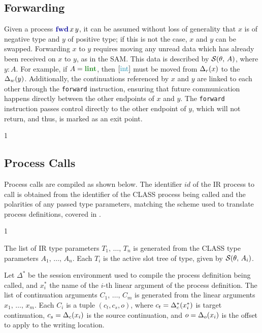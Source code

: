 \subsection{Forwarding}

Given a process $\fwdc{x}{y}$, it can be assumed without loss of generality that $x$ is of negative type and $y$ of positive type; if this is not the case, $x$ and $y$ can be swapped. Forwarding $x$ to $y$ requires moving any unread data which has already been received on $x$ to $y$, as in the \ac{SAM}. This data is described by $\mathcal{S}(\theta,\,A)$, where $y: A$. For example, if $A = \lintt$, then $\seqst{\ints}$ must be moved from $\Delta_r(x)$ to the $\Delta_w(y)$. Additionally, the continuations referenced by $x$ and $y$ are linked to each other through the \texttt{forward} instruction, ensuring that future communication happens directly between the other endpoints of $x$ and $y$. The \texttt{forward} instruction passes control directly to the other endpoint of $y$, which will not return, and thus, is marked as an exit point.
\begin{compilation}{\theta}{\Delta}{}
{1}
\end{compilation}

\subsection{Process Calls}

Process calls are compiled as shown below. The identifier $id$ of the \ac{IR} process to call is obtained from the identifier of the \ac{CLASS} process being called and the polarities of any passed type parameters, matching the scheme used to translate process definitions, covered in .
\begin{compilation}{\theta}{\Delta}{}{1}
\end{compilation}


The list of \ac{IR} type parameters $T_1,\,\dots,\,T_n$ is generated from the \ac{CLASS} type parameters $A_1,\,\dots,\,A_n$. Each $T_i$ is the active slot tree of type, given by $\mathcal{S}(\theta,\,A_i)$. 

Let $\Delta^*$ be the session environment used to compile the process definition being called, and $x^*_i$ the name of the $i$-th linear argument of the process definition. The list of continuation arguments $C_1,\,\dots,\,C_m$ is generated from the linear arguments $x_1,\,\dots,\,x_m$. Each $C_i$ is a tuple $(c_t, c_s, o)$, where $c_t = \Delta^*_c(x^*_i)$ is target continuation, $c_s = \Delta_c(x_i)$ is the source continuation, and $o = \Delta_o(x_i)$ is the offset to apply to the writing location.

